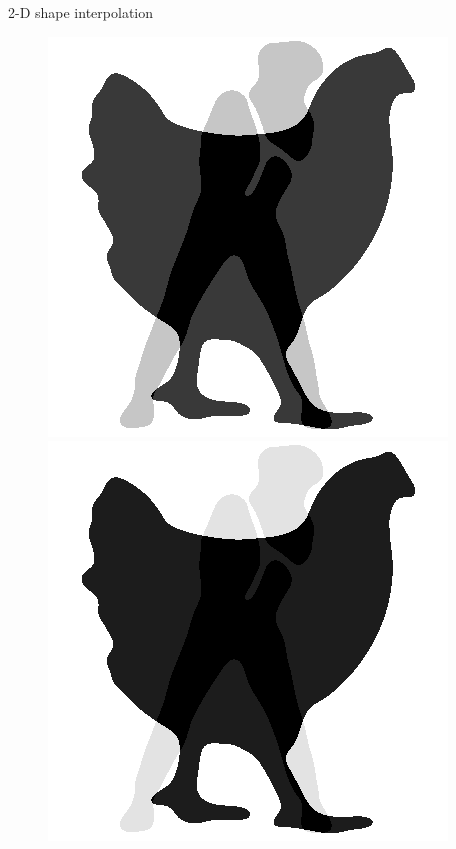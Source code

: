 \begin{frame}{2-D shape interpolation}
\begin{figure}
\begin{minipage}[t]{0.08\linewidth}
        \end{minipage}
        \hfill
        \begin{minipage}[t]{0.08\linewidth}
            \vspace{0pt}
            \centering
            \includegraphics[width=\textwidth]{png/kun-chicken/color7.png}
        \end{minipage}
        \hfill
        \begin{minipage}[t]{0.08\linewidth}
            \vspace{0pt}
            \centering
            \includegraphics[width=\textwidth]{png/kun-chicken/color8.png}

\end{minipage}
\end{figure}
\end{frame}
